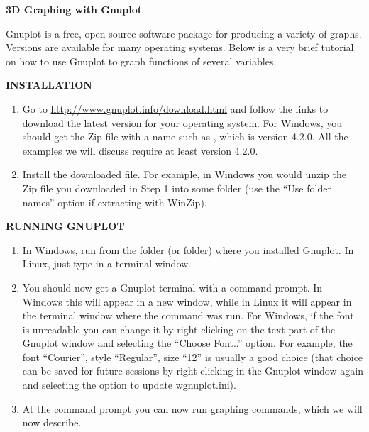 \textsf{\textbf{\Large 3D Graphing with Gnuplot}}\vspace{4mm}

Gnuplot is a free, open-source software package for producing a variety of graphs. Versions are available for many
operating systems. Below is a very brief tutorial on how to use Gnuplot to graph functions of several
variables.\vspace{4mm}

\par\noindent\textbf{INSTALLATION}
\begin{enumerate}
 \item Go to \url{http://www.gnuplot.info/download.html} and follow the links to download the latest version for your
  operating system. For Windows, you should get the Zip file with a name such as , which is
  version 4.2.0. All the examples we will discuss require at least version 4.2.0.
 \item Install the downloaded file. For example, in Windows you would unzip the Zip file you downloaded
  in Step 1 into some folder (use the ``Use folder names'' option if extracting with WinZip).
\end{enumerate}

\par\noindent\textbf{RUNNING GNUPLOT}
\begin{enumerate}
 \item In Windows, run \textbf{} from the folder (or  folder)
  where you installed Gnuplot. In Linux, just type
  \textbf{} in a terminal window.
 \item You should now get a Gnuplot terminal with a \textbf{} command prompt. In Windows this
  will appear
  in a new window, while in Linux it will appear in the terminal window where the \textbf{} command was
  run. For Windows, if the font is unreadable you can change it by right-clicking on the text part of the Gnuplot window
  and selecting the ``Choose Font..'' option. For example, the font ``Courier'', style ``Regular'', size ``12'' is
  usually a
  good choice (that choice can be saved for future sessions by right-clicking in the Gnuplot window again and selecting
  the option to update wgnuplot.ini).
 \item At the \textbf{} command prompt you can now run graphing commands, which we will now
  describe.
\end{enumerate}

